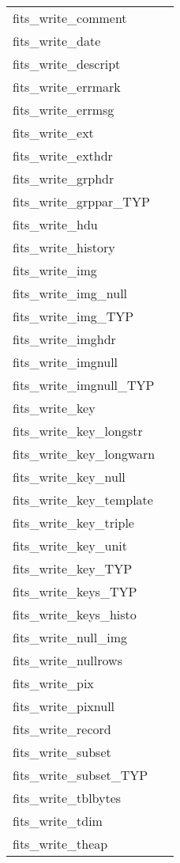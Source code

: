 \documentclass[11pt]{book}
\begin{document}
\begin{tabular}{lr}
fits\_write\_comment      & \pageref{ffpcom} \\
fits\_write\_date         & \pageref{ffpdat} \\
fits\_write\_descript  & \pageref{ffpdes} \\
fits\_write\_errmark   & \pageref{ffpmrk} \\
fits\_write\_errmsg   & \pageref{ffpmsg} \\
fits\_write\_ext        & \pageref{ffgextn} \\
fits\_write\_exthdr        & \pageref{ffphps} \\
fits\_write\_grphdr       & \pageref{ffphpr} \\
fits\_write\_grppar\_TYP & \pageref{ffpgpx} \\
fits\_write\_hdu       & \pageref{ffwrhdu} \\
fits\_write\_history      & \pageref{ffphis} \\
fits\_write\_img        & \pageref{ffppr} \\
fits\_write\_img\_null & \pageref{ffppru} \\
fits\_write\_img\_TYP    & \pageref{ffpprx} \\
fits\_write\_imghdr       & \pageref{ffphps} \\
fits\_write\_imgnull     & \pageref{ffppn} \\
fits\_write\_imgnull\_TYP & \pageref{ffppnx} \\
fits\_write\_key          & \pageref{ffpky} \\
fits\_write\_key\_longstr  & \pageref{ffpkls} \\
fits\_write\_key\_longwarn & \pageref{ffplsw} \\
fits\_write\_key\_null     & \pageref{ffpkyu} \\
fits\_write\_key\_template & \pageref{ffpktp} \\
fits\_write\_key\_triple   & \pageref{ffpkyt} \\
fits\_write\_key\_unit     & \pageref{ffpunt} \\
fits\_write\_key\_TYP      & \pageref{ffpkyx} \\
fits\_write\_keys\_TYP     & \pageref{ffpknx} \\
fits\_write\_keys\_histo   & \pageref{writekeyshisto} \\
fits\_write\_null\_img    & \pageref{ffpprn} \\
fits\_write\_nullrows      & \pageref{ffpclu} \\
fits\_write\_pix          & \pageref{ffppx} \\
fits\_write\_pixnull      & \pageref{ffppxn} \\
fits\_write\_record       & \pageref{ffprec} \\
fits\_write\_subset       & \pageref{ffpss} \\
fits\_write\_subset\_TYP  & \pageref{ffpssx} \\
fits\_write\_tblbytes  & \pageref{ffptbb} \\
fits\_write\_tdim         & \pageref{ffptdm} \\
fits\_write\_theap    & \pageref{ffpthp} \\
\end{tabular}
\end{document}
